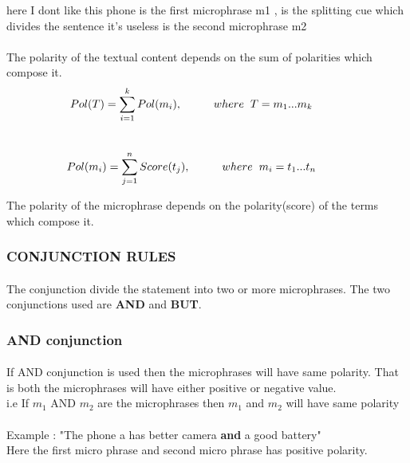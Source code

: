 here I dont like this phone is the first microphrase m1 
, is the splitting cue which divides the sentence 
it's useless is the second microphrase m2
\\ \\
The polarity of the textual content depends on the sum of polarities which compose it.
$$
Pol(T) = \sum_{i=1}^{k} Pol(m_i)  , \hspace{1cm} where\hspace{0.2cm} T={m_1...m_k} \hspace{1cm} 
$$
\\
\begin{equation}
Pol(m_i) = \sum_{j=1}^{n} Score(t_j) ,\hspace{1cm} where\hspace{0.2cm} m_i={t_1...t_n} \hspace{1cm}
\end{equation} 


The polarity  of  the  microphrase depends on the polarity(score) of the terms which compose it.


\subsubsection{CONJUNCTION RULES}
\paragraph{} The conjunction divide the statement into two or more microphrases. The two conjunctions used are \textbf{AND} and \textbf{BUT}.
\subsubsection{AND conjunction}
\paragraph{} If AND conjunction is used then the microphrases will have same polarity. That is both the microphrases will have either positive or negative value. \\
i.e  If $ m_1 $ AND $ m_2 $ are the microphrases
then $ m_1 $ and $ m_2 $ will have same polarity
\\ \\
Example : "The phone a has better camera \textbf{and} a good battery"
\\
Here the first micro phrase and second micro phrase has positive polarity.
